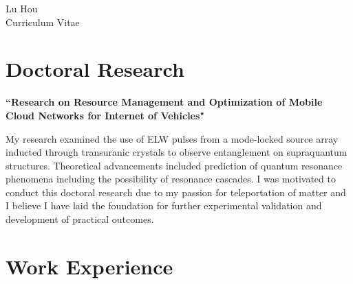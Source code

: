 \documentclass[10pt]{article} %
\begin{document}
\begin{paracol}{2} %


\parbox[top][0.12\textheight][c]{\linewidth}{ %
	\vspace{-0.04\textheight} %
	\centering %
	{\sffamily\Huge Lu Hou}\\\medskip %
	{\Huge\color{headings}\cvtextfont Curriculum Vitae}
}


\section{Doctoral Research}

{\raggedright\textbf{``Research on Resource Management and Optimization of Mobile Cloud Networks for Internet of Vehicles"}\\\medskip}

My research examined the use of ELW pulses from a mode-locked source array inducted through transuranic crystals to observe entanglement on supraquantum structures. Theoretical advancements included prediction of quantum resonance phenomena including the possibility of resonance cascades. I was motivated to conduct this doctoral research due to my passion for teleportation of matter and I believe I have laid the foundation for further experimental validation and development of practical outcomes.

\medskip %


\section{Work Experience}


\end{paracol}
\end{document}
